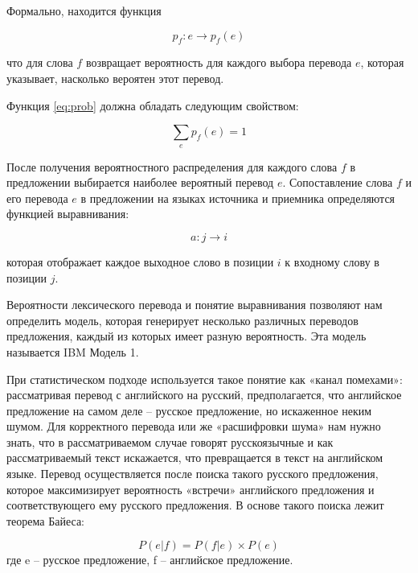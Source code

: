 \clearpage

Формально, находится функция \cite{smt_book}

\begin{equation}
	\label{eq:prob}
	p_f : e \rightarrow p_f(e)
\end{equation}

что для слова $f$ возвращает вероятность для каждого выбора перевода $e$, которая указывает, насколько вероятен этот перевод.

Функция \ref{eq:prob} должна  обладать следующим свойством:

\begin{equation}
	\label{eq:prop1_prob}
	\displaystyle\sum_e p_f(e) = 1
\end{equation}

После получения вероятностного распределения для каждого слова $f$ в предложении выбирается наиболее вероятный перевод $e$. Сопоставление слова $f$ и его перевода $e$ в предложении на языках источника и приемника определяются функцией выравнивания:

\begin{equation}
	\label{eq:alig}
	a : j \rightarrow i
\end{equation}

которая отображает каждое выходное слово в позиции $i$ к входному слову в позиции $j$.

Вероятности лексического перевода и понятие выравнивания позволяют нам определить модель, которая генерирует несколько различных переводов предложения, каждый из которых имеет разную вероятность. Эта модель называется IBM Модель 1.

\clearpage

При статистическом подходе используется такое понятие как «канал   помехами»\cite{smt}: рассматривая перевод с английского на русский, предполагается, что английское предложение на самом деле – русское предложение, но искаженное неким шумом. Для корректного перевода или же «расшифровки шума» нам нужно знать, что в рассматриваемом случае говорят русскоязычные и как рассматриваемый текст искажается, что превращается в текст на английском языке. Перевод осуществляется после поиска такого русского предложения, которое максимизирует вероятность «встречи» английского предложения и соответствующего ему русского предложения. В основе такого поиска лежит теорема Байеса:

\begin{equation}
	\label{eq:L}
	P(e|f) = P(f|e) \times P(e)
\end{equation}
где e – русское предложение, f – английское предложение.

